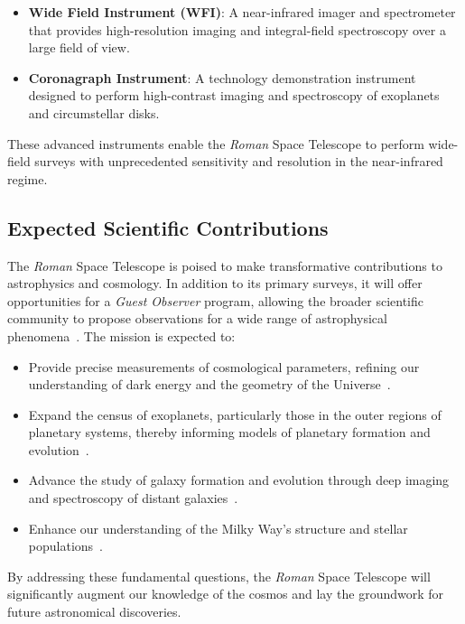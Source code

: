 \begin{itemize}
    \item \textbf{Wide Field Instrument (WFI)}: A near-infrared imager and spectrometer that provides high-resolution imaging and integral-field spectroscopy over a large field of view.
    \item \textbf{Coronagraph Instrument}: A technology demonstration instrument designed to perform high-contrast imaging and spectroscopy of exoplanets and circumstellar disks.
\end{itemize}

These advanced instruments enable the \emph{Roman} Space Telescope to perform wide-field surveys with unprecedented sensitivity and resolution in the near-infrared regime.

\subsection{Expected Scientific Contributions}

The \emph{Roman} Space Telescope is poised to make transformative contributions to astrophysics and cosmology. In addition to its primary surveys, it will offer opportunities for a \emph{Guest Observer} program, allowing the broader scientific community to propose observations for a wide range of astrophysical phenomena~\cite{2019arXiv190205569A}. The mission is expected to:

\begin{itemize}
    \item Provide precise measurements of cosmological parameters, refining our understanding of dark energy and the geometry of the Universe~\cite{2018ApJ...867...23H}.
    \item Expand the census of exoplanets, particularly those in the outer regions of planetary systems, thereby informing models of planetary formation and evolution~\cite{2019ApJS..241....3P}.
    \item Advance the study of galaxy formation and evolution through deep imaging and spectroscopy of distant galaxies~\cite{2018MNRAS.477.5382B}.
    \item Enhance our understanding of the Milky Way's structure and stellar populations~\cite{2020AJ....160..123J}.
\end{itemize}

By addressing these fundamental questions, the \emph{Roman} Space Telescope will significantly augment our knowledge of the cosmos and lay the groundwork for future astronomical discoveries.
